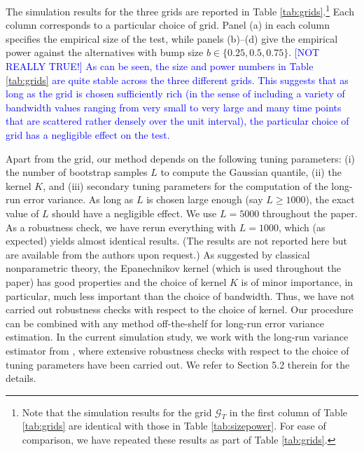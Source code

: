 \documentclass[12pt]{article}
\begin{document}
The simulation results for the three grids are reported in Table \ref{tab:grids}.\footnote{Note that the simulation results for the grid $\mathcal{G}_T$ in the first column of Table \ref{tab:grids} are identical with those in Table \ref{tab:sizepower}. For ease of comparison, we have repeated these results as part of Table \ref{tab:grids}.}
Each column corresponds to a particular choice of grid. Panel (a) in each column specifies the empirical size of the test, while panels (b)--(d) give the empirical power against the alternatives with bump size $b \in \{0.25,0.5,0.75\}$. 
\textcolor{blue}{[NOT REALLY TRUE!]
As can be seen, the size and power numbers in Table \ref{tab:grids} are quite stable across the three different grids. %
This suggests that as long as the grid is chosen sufficiently rich (in the sense of including a variety of bandwidth values ranging from very small to very large and many time points that are scattered rather densely over the unit interval), the particular choice of grid has a negligible effect on the test.} 


Apart from the grid, our method depends on the following tuning parameters: (i) the number of bootstrap samples $L$ to compute the Gaussian quantile, (ii) the kernel $K$, and (iii) secondary tuning parameters for the computation of the long-run error variance. 
As long as $L$ is chosen large enough (say $L \ge 1000$), the exact value of $L$ should have a negligible effect. We use $L=5000$ throughout the paper. As a robustness check, we have rerun everything with $L=1000$, which (as expected) yields almost identical results. (The results are not reported here but are available from the authors upon request.) 
As suggested by classical nonparametric theory, the Epanechnikov kernel (which is used throughout the paper) has good properties and the choice of kernel $K$ is of minor importance, in particular, much less important than the choice of bandwidth. Thus, we have not carried out robustness checks with respect to the choice of kernel.
Our procedure can be combined with any method off-the-shelf for long-run error variance estimation. In the current simulation study, we work with the long-run variance estimator from \cite{KhismatullinaVogt2020}, where extensive robustness checks with respect to the choice of tuning parameters have been carried out. We refer to Section 5.2 therein for the details.
\end{document}
